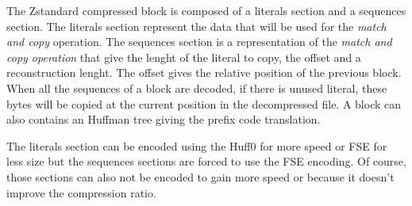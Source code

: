 \documentclass{sig-alternate-05-2015}
\begin{document}
    The Zstandard compressed block is composed of a literals section and a sequences section. The
    literals section represent the data that will be used for the \textit{match and copy} operation.
    The sequences section is a representation of the \textit{match and copy operation} that give the
    lenght of the literal to copy, the offset and a reconstruction lenght. The offset gives the
    relative position of the previous block. When all the sequences of a block are decoded, if there is
    unused literal, these bytes will be copied at the current position in the decompressed file. A
    block can also contains an Huffman tree giving the prefix code translation.

    The literals section can be encoded using the Huff0 for more speed or FSE for less size but the
    sequences sections are forced to use the FSE encoding. Of course, those sections can also not be
    encoded to gain more speed or because it doesn't improve the compression ratio.
\end{document}
